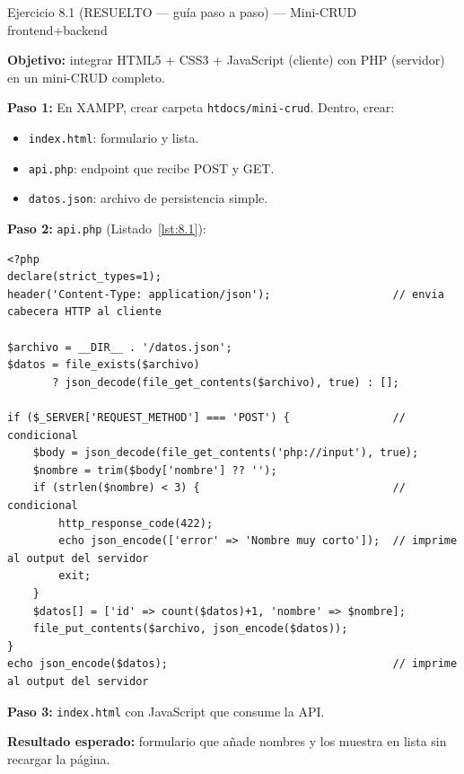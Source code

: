 \documentclass[11pt,a4paper,openany]{book}
\begin{document}
\begin{cajaejercicio}{Ejercicio 8.1 (RESUELTO --- guía paso a paso) --- Mini-CRUD frontend+backend}

\textbf{Objetivo:} integrar HTML5 + CSS3 + JavaScript (cliente) con
PHP (servidor) en un mini-CRUD completo.

\textbf{Paso 1:} En XAMPP, crear carpeta
\texttt{htdocs/mini-crud}. Dentro, crear:
\begin{itemize}
\item \texttt{index.html}: formulario y lista.
\item \texttt{api.php}: endpoint que recibe POST y GET.
\item \texttt{datos.json}: archivo de persistencia simple.
\end{itemize}

\textbf{Paso 2:} \texttt{api.php} (Listado~\ref{lst:8.1}):
\begin{lstlisting}[style=php,numbers=none,caption={Ejemplo de PHP},label=lst:8.1]
<?php
declare(strict_types=1);
header('Content-Type: application/json');                   // envia cabecera HTTP al cliente

$archivo = __DIR__ . '/datos.json';
$datos = file_exists($archivo)
       ? json_decode(file_get_contents($archivo), true) : [];

if ($_SERVER['REQUEST_METHOD'] === 'POST') {                // condicional
    $body = json_decode(file_get_contents('php://input'), true);
    $nombre = trim($body['nombre'] ?? '');
    if (strlen($nombre) < 3) {                              // condicional
        http_response_code(422);
        echo json_encode(['error' => 'Nombre muy corto']);  // imprime al output del servidor
        exit;
    }
    $datos[] = ['id' => count($datos)+1, 'nombre' => $nombre];
    file_put_contents($archivo, json_encode($datos));
}
echo json_encode($datos);                                   // imprime al output del servidor
\end{lstlisting}

\textbf{Paso 3:} \texttt{index.html} con JavaScript que consume la
API.

\textbf{Resultado esperado:} formulario que añade nombres y los
muestra en lista sin recargar la página.

\end{cajaejercicio}
\end{document}
